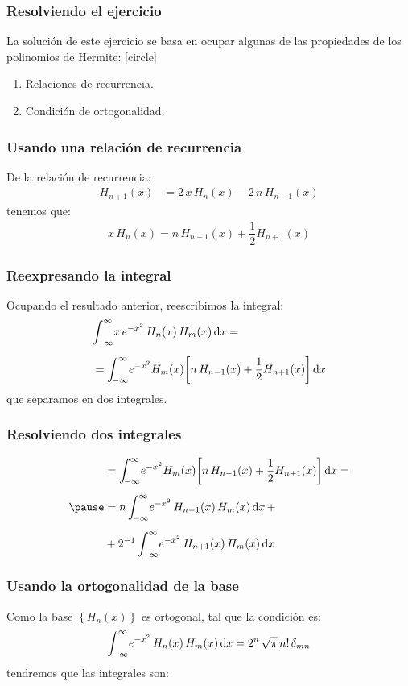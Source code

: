 \documentclass[12pt]{beamer}
\begin{document}
\begin{frame}
\frametitle{Resolviendo el ejercicio}
La solución de este ejercicio se basa en ocupar algunas de las propiedades de los polinomios de Hermite:
\pause
{}
[circle]
\begin{enumerate}[<+->]
\item Relaciones de recurrencia.
\item Condición de ortogonalidad.
\end{enumerate}
\end{frame}
\begin{frame}
\frametitle{Usando una relación de recurrencia}
De la relación de recurrencia:
\pause
\begin{align*}
H_{n+1} (x) &= 2 \, x \, H_{n} (x) - 2 \, n \, H_{n-1} (x)
\end{align*}
\pause
tenemos que:
\begin{align*}
x \, H_{n} (x) = n \, H_{n-1} (x) + \dfrac{1}{2} H_{n+1} (x)
\end{align*}
\end{frame}
\begin{frame}
\frametitle{Reexpresando la integral}
Ocupando el resultado anterior, reescribimos la integral:
\pause
\begin{align*}
&\scaleint{5ex}_{\bs -\infty}^{\infty} x \, e^{-x^{2}} \, H_{n}(x) \, H_{m}(x) \dd{x} = \\[0.5em]
&= \scaleint{5ex}_{\bs -\infty}^{\infty} e^{-x^{2}} H_{m}(x) \bigg[ n \, H_{n-1} (x) + \dfrac{1}{2} H_{n+1} (x) \bigg] \dd{x}
\end{align*}
\pause
que separamos en dos integrales.
\end{frame}
\begin{frame}
\frametitle{Resolviendo dos integrales}
\begin{eqnarray*}
&= \scaleint{5ex}_{\bs -\infty}^{\infty} e^{-x^{2}} H_{m}(x) \bigg[ n \, H_{n-1} (x) + \dfrac{1}{2} H_{n+1} (x) \bigg] \dd{x} = \\[0.5em] \pause
&= n \, \scaleint{5ex}_{\bs -\infty}^{\infty} e^{-x^{2}} \, H_{n-1} (x) \, H_{m}(x) \dd{x} + \\[0.5em]
&+ 2^{-1} \, \scaleint{5ex}_{\bs -\infty}^{\infty} e^{-x^{2}} \, H_{n+1} (x) \, H_{m}(x) \dd{x}
\end{eqnarray*}
\end{frame}
\begin{frame}
\frametitle{Usando la ortogonalidad de la base}
Como la base $\left\{ H_{n}(x) \right\}$ es ortogonal, tal que la condición es:
\begin{align*}
\scaleint{5ex}_{\bs -\infty}^{\infty} e^{-x^{2}} \, H_{n} (x) \, H_{m} (x) \dd{x} = 2^{n} \, \sqrt{\pi} \, n! \, \delta_{m n}
\end{align*}
\pause
tendremos que las integrales son:
\end{frame}
\end{document}
